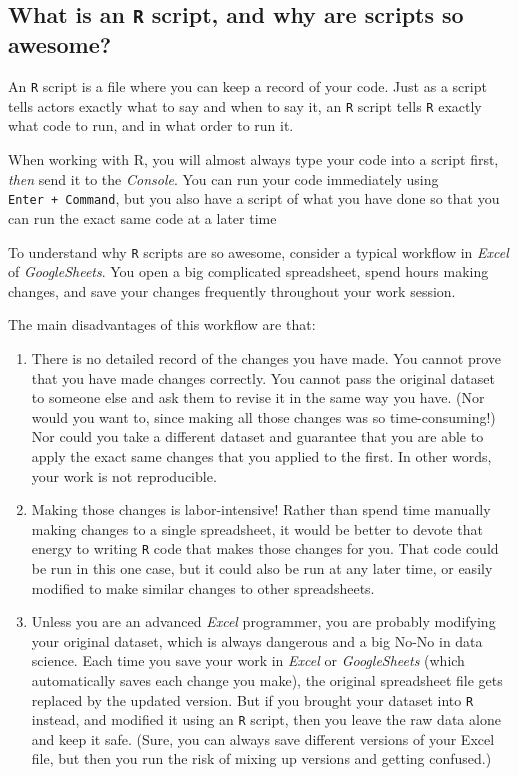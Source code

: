 \documentclass[
]{book}
\begin{document}
\subsection*{\texorpdfstring{What is an \texttt{R} script, and why are scripts so awesome?}{What is an R script, and why are scripts so awesome?}}\label{what-is-an-r-script-and-why-are-scripts-so-awesome}

An \texttt{R} script is a file where you can keep a record of your code. Just as a script tells actors exactly what to say and when to say it, an \texttt{R} script tells \texttt{R} exactly what code to run, and in what order to run it.

When working with R, you will almost always type your code into a script first, \emph{then} send it to the \emph{Console}. You can run your code immediately using \texttt{Enter\ +\ Command}, but you also have a script of what you have done so that you can run the exact same code at a later time

To understand why \texttt{R} scripts are so awesome, consider a typical workflow in \emph{Excel} of \emph{GoogleSheets}. You open a big complicated spreadsheet, spend hours making changes, and save your changes frequently throughout your work session.

The main disadvantages of this workflow are that:

\begin{enumerate}
\def\labelenumi{\arabic{enumi}.}
\item
  There is no detailed record of the changes you have made. You cannot prove that you have made changes correctly. You cannot pass the original dataset to someone else and ask them to revise it in the same way you have. (Nor would you want to, since making all those changes was so time-consuming!) Nor could you take a different dataset and guarantee that you are able to apply the exact same changes that you applied to the first. In other words, your work is not reproducible.
\item
  Making those changes is labor-intensive! Rather than spend time manually making changes to a single spreadsheet, it would be better to devote that energy to writing \texttt{R} code that makes those changes for you. That code could be run in this one case, but it could also be run at any later time, or easily modified to make similar changes to other spreadsheets.
\item
  Unless you are an advanced \emph{Excel} programmer, you are probably modifying your original dataset, which is always dangerous and a big No-No in data science. Each time you save your work in \emph{Excel} or \emph{GoogleSheets} (which automatically saves each change you make), the original spreadsheet file gets replaced by the updated version. But if you brought your dataset into \texttt{R} instead, and modified it using an \texttt{R} script, then you leave the raw data alone and keep it safe. (Sure, you can always save different versions of your Excel file, but then you run the risk of mixing up versions and getting confused.)
\end{enumerate}
\end{document}
